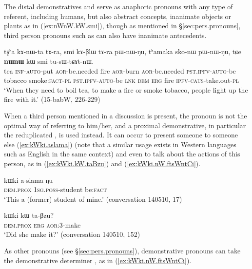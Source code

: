 The distal demonstratives  and  serve as anaphoric pronouns with any type of referent, including humans, but also abstract concepts, inanimate objects or plants as in (\ref{ex:nWnW.kW.smi}), though as mentioned in §\ref{sec:pers.pronouns},  third person pronouns such as  can also have inanimate antecedents.

\begin{exe}
\ex \label{ex:nWnW.kW.smi}
 \gll tʂʰa kɤ-nɯ-ta tɤ-ra, smi kɤ-βlɯ tɤ-ra pɯ-nɯ-ŋu, tʰamaka sko-nɯ pɯ-nɯ-ŋu, tɕe \textbf{nɯnɯ} kɯ smi tu-sɯ-tɕɤt-nɯ. \\
 tea \textsc{inf}-\textsc{auto}-put \textsc{aor}-be.needed fire  \textsc{aor}-burn \textsc{aor}-be.needed \textsc{pst}.\textsc{ipfv}-\textsc{auto}-be tobacco smoke:\textsc{fact}-\textsc{pl} \textsc{pst}.\textsc{ipfv}-\textsc{auto}-be \textsc{lnk} \textsc{dem} \textsc{erg} fire \textsc{ipfv}-\textsc{caus}-take.out-\textsc{pl} \\
 \glt `When they need to boil tea, to make a fire or smoke tobacco, people light up the fire with it.' (15-babW, 226-229)
\end{exe}

When a third person mentioned in a discussion is present, the pronoun  is not the optimal way of referring to him/her, and a proximal demonstrative, in particular the reduplicated , is used instead. It can occur to present someone to someone else (\ref{ex:kWki.aslama}) (note that a similar usage exists in Western languages such as English in the same context) and even to talk about the actions of this person, as in  (\ref{ex:kWki.kW.taBzu}) and (\ref{ex:kWki.nW.ftsWntCi}).

\begin{exe}
\ex \label{ex:kWki.aslama}
 \gll kɯki a-slama ŋu \\
\textsc{dem}.\textsc{prox} \textsc{1sg}.\textsc{poss}-student be:\textsc{fact} \\
\glt `This a (former) student of mine.' (conversation 140510, 17)
\end{exe}

\begin{exe}
\ex \label{ex:kWki.kW.taBzu}
 \gll  kɯki kɯ ta-βzu? \\
 \textsc{dem}.\textsc{prox} \textsc{erg} \textsc{aor}:3\flobv{}-make \\
 \glt `Did she make it?' (conversation 140510, 152)
\end{exe}

As other pronouns (see §\ref{sec:pers.pronouns}), demonstrative pronouns can take the demonstrative determiner , as in (\ref{ex:kWki.nW.ftsWntCi}).

